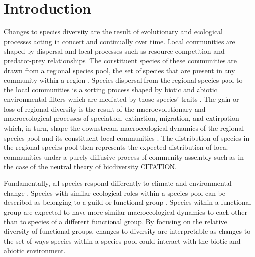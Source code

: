 \documentclass[12pt,letterpaper]{article}
\begin{document}
\section*{Introduction}
Changes to species diversity are the result of evolutionary and ecological processes acting in concert and continually over time. Local communities are shaped by dispersal and local processes such as resource competition and predator-prey relationships. The constituent species of these communities are drawn from a regional species pool, the set of species that are present in any community within a region \citep{Mittelbach2015a,Urban2008,Harrison2008}. Species dispersal from the regional species pool to the local communities is a sorting process shaped by biotic and abiotic environmental filters which are mediated by those species' traits \citep{Shipley2006,Elith2009,Urban2008,Loeuille2008,Cottenie2005,Harrison2008}. The gain or loss of regional diversity is the result of the macroevolutionary and macroecological processes of speciation, extinction, migration, and extirpation which, in turn, shape the downstream macroecological dynamics of the regional species pool and its constituent local communities \citep{Urban2008,Mittelbach2015a,Harrison2008}. The distribution of species in the regional species pool then represents the expected distribution of local communities under a purely diffusive process of community assembly such as in the case of the neutral theory of biodiversity CITATION.

Fundamentally, all species respond differently to climate and environmental change \citep{Blois2009}. Species with similar ecological roles within a species pool can be described as belonging to a guild or functional group \citep{Valentine1969,Bambach1977,Brown1989,Simberloff1991a,Wilson1999}. Species within a functional group are expected to have more similar macroecological dynamics to each other than to species of a different functional group. By focusing on the relative diversity of functional groups, changes to diversity are interpretable as changes to the set of ways species within a species pool could interact with the biotic and abiotic environment. 
\end{document}
